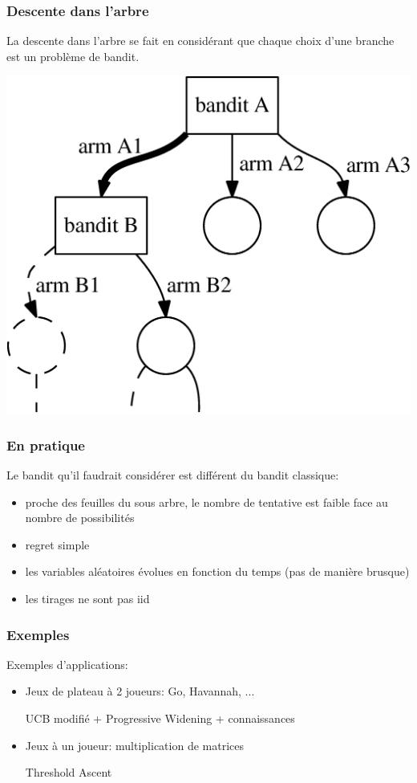 \documentclass{beamer}
\begin{document}
\begin{frame}
    \frametitle{Descente dans l'arbre}
    La descente dans l'arbre se fait en considérant que chaque choix d'une branche est un problème de bandit.

    \begin{center}
        \includegraphics[scale=0.5]{bandit_cascade.png}
    \end{center}


\end{frame}

\begin{frame}
    \frametitle{En pratique}

    Le bandit qu'il faudrait considérer est différent du bandit classique:
    \begin{itemize}
        \item proche des feuilles du sous arbre, le nombre de tentative est faible face au nombre de possibilités
        \item regret simple
        \item les variables aléatoires évolues en fonction du temps (pas de manière brusque)
        \item les tirages ne sont pas iid
    \end{itemize}


\end{frame}

\begin{frame}
    \frametitle{Exemples}

    Exemples d'applications:
    \begin{itemize}
        \item Jeux de plateau à 2 joueurs: Go, Havannah, ...

            UCB modifié + Progressive Widening + connaissances
        \item Jeux à un joueur: multiplication de matrices

            Threshold Ascent  
    \end{itemize}

\end{frame}
\end{document}
